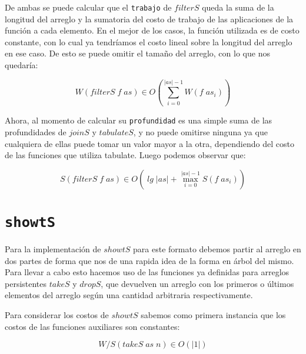 \documentclass[a4paper,10pt]{article}
\begin{document}
\bigskip
\bigskip

    De ambas se puede calcular que el \texttt{trabajo} de $filterS$ queda la
suma de la longitud del arreglo y la sumatoria del costo de trabajo de las
aplicaciones de la función a cada elemento. En el mejor de los casos, la función
utilizada es de costo constante, con lo cual ya tendríamos el costo lineal sobre
la longitud del arreglo en ese caso. De esto se puede omitir el tamaño del arreglo,
con lo que nos quedaría:
 
\begin{equation*}
    W \left(filterS \;f \;as \right) \in
    O \left( \sum_{i=0}^{\vert as \vert -1} W \left( f\; as_i \right) \right)
\end{equation*}

\bigskip

    Ahora, al momento de calcular su \texttt{profundidad} es una simple suma
de las profundidades de $joinS$ y $tabulateS$, y no puede omitirse ninguna ya
que cualquiera de ellas puede tomar un valor mayor a la otra, dependiendo del
costo de las funciones que utiliza tabulate. Luego podemos observar que:

\begin{equation*}
    S \left( filterS \;f \;as \right) \in
    O \left( \;lg \; \vert as \vert + \max_{i=0}^{\vert as \vert -1} S \left( f\; as_i \right) \right)
\end{equation*}


\bigskip


\section*{\texttt{showtS}}

    Para la implementación de $showtS$ para este formato debemos partir al arreglo
en dos partes de forma que nos de una rapida idea de la forma en árbol del mismo.
Para llevar a cabo esto hacemos uso de las funciones ya definidas para arreglos 
persistentes $takeS$ y $dropS$, que devuelven un arreglo con los primeros o últimos
elementos del arreglo según una cantidad arbitraria respectivamente.

    Para considerar los costos de $showtS$ sabemos como primera instancia que los
costos de las funciones auxiliares son constantes:

\begin{equation*}
    W/S \left( takeS\; as\; n \right) \in 
    O \left( \vert 1 \vert \right)
\end{equation*}
\end{document}
